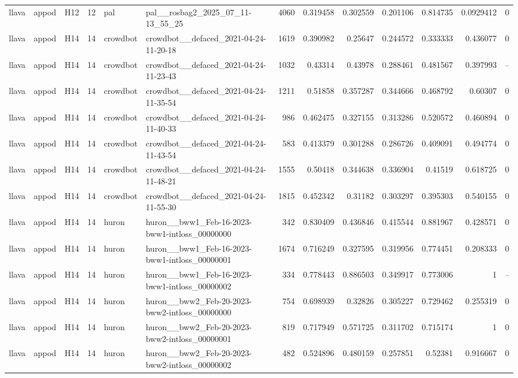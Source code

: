\begin{longtable}{lllrllrrrrrrr}
llava & appod & H12 & 12 & pal & pal\_\_rosbag2\_2025\_07\_11-13\_55\_25 & 4060 & 0.319458 & 0.302559 & 0.201106 & 0.814735 & 0.0929412 & 0 \\
llava & appod & H14 & 14 & crowdbot & crowdbot\_\_defaced\_2021-04-24-11-20-18 & 1619 & 0.390982 & 0.25647 & 0.244572 & 0.333333 & 0.436077 & 0 \\
llava & appod & H14 & 14 & crowdbot & crowdbot\_\_defaced\_2021-04-24-11-23-43 & 1032 & 0.43314 & 0.43978 & 0.288461 & 0.481567 & 0.397993 & -- \\
llava & appod & H14 & 14 & crowdbot & crowdbot\_\_defaced\_2021-04-24-11-35-54 & 1211 & 0.51858 & 0.357287 & 0.344666 & 0.468792 & 0.60307 & 0 \\
llava & appod & H14 & 14 & crowdbot & crowdbot\_\_defaced\_2021-04-24-11-40-33 & 986 & 0.462475 & 0.327155 & 0.313286 & 0.520572 & 0.460894 & 0 \\
llava & appod & H14 & 14 & crowdbot & crowdbot\_\_defaced\_2021-04-24-11-43-54 & 583 & 0.413379 & 0.301288 & 0.286726 & 0.409091 & 0.494774 & 0 \\
llava & appod & H14 & 14 & crowdbot & crowdbot\_\_defaced\_2021-04-24-11-48-21 & 1555 & 0.50418 & 0.344638 & 0.336904 & 0.41519 & 0.618725 & 0 \\
llava & appod & H14 & 14 & crowdbot & crowdbot\_\_defaced\_2021-04-24-11-55-30 & 1815 & 0.452342 & 0.31182 & 0.303297 & 0.395303 & 0.540155 & 0 \\
llava & appod & H14 & 14 & huron & huron\_\_bww1\_Feb-16-2023-bww1-intloss\_00000000 & 342 & 0.830409 & 0.436846 & 0.415544 & 0.881967 & 0.428571 & 0 \\
llava & appod & H14 & 14 & huron & huron\_\_bww1\_Feb-16-2023-bww1-intloss\_00000001 & 1674 & 0.716249 & 0.327595 & 0.319956 & 0.774451 & 0.208333 & 0 \\
llava & appod & H14 & 14 & huron & huron\_\_bww1\_Feb-16-2023-bww1-intloss\_00000002 & 334 & 0.778443 & 0.886503 & 0.349917 & 0.773006 & 1 & -- \\
llava & appod & H14 & 14 & huron & huron\_\_bww2\_Feb-20-2023-bww2-intloss\_00000000 & 754 & 0.698939 & 0.32826 & 0.305227 & 0.729462 & 0.255319 & 0 \\
llava & appod & H14 & 14 & huron & huron\_\_bww2\_Feb-20-2023-bww2-intloss\_00000001 & 819 & 0.717949 & 0.571725 & 0.311702 & 0.715174 & 1 & 0 \\
llava & appod & H14 & 14 & huron & huron\_\_bww2\_Feb-20-2023-bww2-intloss\_00000002 & 482 & 0.524896 & 0.480159 & 0.257851 & 0.52381 & 0.916667 & 0 \\

\end{longtable}
